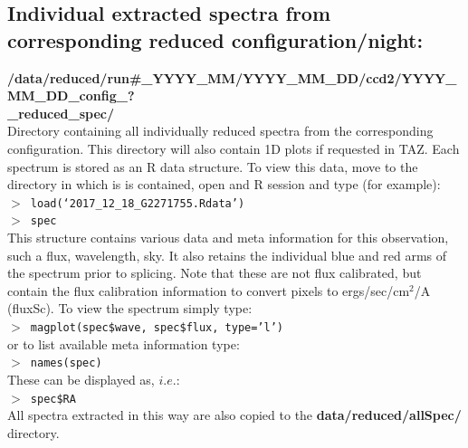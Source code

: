 \documentclass[12pt]{article}
\begin{document}
 \subsection{Individual extracted spectra from corresponding reduced configuration/night:}
 
  \textbf{/data/reduced/run\#\_YYYY\_MM/YYYY\_MM\_DD/ccd2/YYYY\_MM\_DD\_config\_? \\ \_reduced\_spec/}\\
   
 Directory containing all individually reduced spectra from the corresponding  configuration. This directory will also contain 1D plots if requested in TAZ. Each spectrum is stored as an R data structure. To view this data, move to the directory in which is is contained, open and R session and type (for example):\\
  
\hspace{10mm}  \texttt{$>$ load(`2017\_12\_18\_G2271755.Rdata')}\\

\hspace{10mm}  \texttt{$>$ spec}\\  

This structure contains various data and meta information for this observation, such a flux, wavelength, sky. It also retains the individual blue and red arms of the spectrum prior to splicing. Note that these are not flux calibrated, but contain the flux calibration information to convert pixels to ergs/sec/cm$^2$/A (fluxSc). To view the spectrum simply type:\\

 \hspace{10mm}  \texttt{$>$ magplot(spec\$wave, spec\$flux, type='l')}\\  

or to list available meta information type:\\

 \hspace{10mm}  \texttt{$>$ names(spec)}\\  

These can be displayed as, $i.e.$:\\

 \hspace{10mm}  \texttt{$>$ spec\$RA}\\ 
 
 All spectra extracted in this way are also copied to the \textbf{data/reduced/allSpec/} directory.
\end{document}
